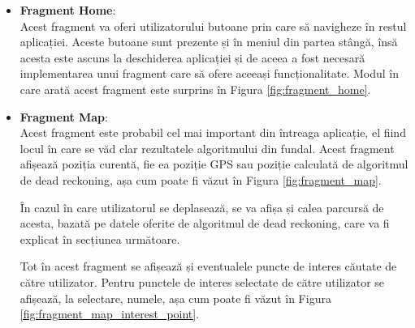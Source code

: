 \documentclass[12pt, a4paper, oneside]{article}
\begin{document}
\begin{itemize}  
\item \textbf{Fragment Home}:\\
Acest fragment va oferi utilizatorului butoane prin care să navigheze în restul aplicației. Aceste butoane sunt prezente și în meniul din partea stângă, însă acesta este ascuns la deschiderea aplicației și de aceea a fost necesară implementarea unui fragment care să ofere aceeași funcționalitate. Modul în care arată acest fragment este surprins în Figura \ref{fig:fragment_home}.

\item \textbf{Fragment Map}:\\
Acest fragment este probabil cel mai important din întreaga aplicație, el fiind locul în care se văd clar rezultatele algoritmului din fundal. Acest fragment afișează poziția curentă, fie ea poziție GPS sau poziție calculată de algoritmul de dead reckoning, așa cum poate fi văzut în Figura \ref{fig:fragment_map}.

În cazul în care utilizatorul se deplasează, se va afișa și calea parcursă de acesta, bazată pe datele oferite de algoritmul de dead reckoning, care va fi explicat în secțiunea următoare.

Tot în acest fragment se afișează și eventualele puncte de interes căutate de către utilizator. Pentru punctele de interes selectate de către utilizator se afișează, la selectare, numele, așa cum poate fi văzut în Figura \ref{fig:fragment_map_interest_point}.


\end{itemize}
\end{document}

